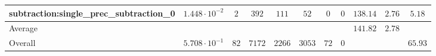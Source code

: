 \begin{tabular}{|l|c|c|c|c|c|c|c|c|c|c|}
subtraction:single\_prec\_subtraction\_0         & $ 1.448 \cdot 10^{-2} $ & $ 2      $ & $ 392  $ & $ 111  $ & $ 52    $ & $ 0  $ & $ 0 $ & $ 138.14      $ & $ 2.76    $ & $ 5.18    $ \\
\hline
Average                                          & $                     $ & $        $ & $      $ & $      $ & $       $ & $    $ & $   $ & $ 141.82      $ & $ 2.78    $ & $         $ \\
\hline
Overall                                          & $ 5.708 \cdot 10^{-1} $ & $ 82     $ & $ 7172 $ & $ 2266 $ & $ 3053  $ & $ 72 $ & $ 0 $ & $             $ & $         $ & $ 65.93   $ \\
\hline
\end{tabular}
